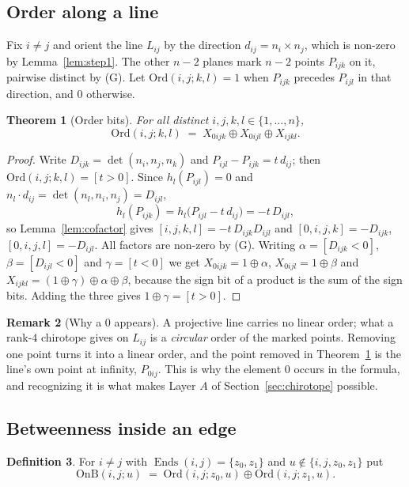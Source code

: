\documentclass[11pt,reqno]{amsart}
\theoremstyle{plain}
\newtheorem{theorem}{Theorem}[section]
\theoremstyle{definition}
\newtheorem{definition}[theorem]{Definition}
\newtheorem{remark}[theorem]{Remark}
\newcommand{\bra}[1]{[#1]}
\newcommand{\Ends}{\operatorname{Ends}}
\newcommand{\OnB}{\mathrm{OnB}}
\newcommand{\Ord}{\mathrm{Ord}}
\newcommand{\xor}{\oplus}
\DeclareMathOperator{\dett}{det}
\begin{document}
\subsection{Order along a line}
Fix $i\ne j$ and orient the line $L_{ij}$ by the direction $d_{ij}=n_i\times n_j$, which is non-zero by
Lemma~\ref{lem:step1}. The other $n-2$ planes mark $n-2$ points $P_{ijk}$ on it, pairwise distinct by
(G). Let $\Ord(i,j;k,l)=1$ when $P_{ijk}$ precedes $P_{ijl}$ in that direction, and $0$ otherwise.

\begin{theorem}[Order bits]\label{thm:order}
For all distinct $i,j,k,l\in\{1,\dots,n\}$,
\[
   \Ord(i,j;k,l)\;=\;X_{0ijk}\xor X_{0ijl}\xor X_{ijkl}.
\]
\end{theorem}

\begin{proof}
Write $D_{ijk}=\dett(n_i,n_j,n_k)$ and $P_{ijl}-P_{ijk}=t\,d_{ij}$; then $\Ord(i,j;k,l)=[t>0]$. Since
$h_l(P_{ijl})=0$ and $n_l\cdot d_{ij}=\dett(n_l,n_i,n_j)=D_{ijl}$,
\[
  h_l(P_{ijk})=h_l\big(P_{ijl}-t\,d_{ij}\big)=-t\,D_{ijl},
\]
so Lemma~\ref{lem:cofactor} gives $\bra{i,j,k,l}=-t\,D_{ijk}D_{ijl}$ and
$\bra{0,i,j,k}=-D_{ijk}$, $\bra{0,i,j,l}=-D_{ijl}$. All factors are non-zero by (G). Writing
$\alpha=[D_{ijk}<0]$, $\beta=[D_{ijl}<0]$ and $\gamma=[t<0]$ we get $X_{0ijk}=1\xor\alpha$,
$X_{0ijl}=1\xor\beta$ and $X_{ijkl}=(1\xor\gamma)\xor\alpha\xor\beta$, because the sign bit of a
product is the sum of the sign bits. Adding the three gives $1\xor\gamma=[t>0]$.
\end{proof}

\begin{remark}[Why a $0$ appears]\label{rem:cut}
A projective line carries no linear order; what a rank-$4$ chirotope gives on $L_{ij}$ is a
\emph{circular} order of the marked points. Removing one point turns it into a linear order, and the
point removed in Theorem~\ref{thm:order} is the line's own point at infinity, $P_{0ij}$. This is why
the element $0$ occurs in the formula, and recognizing it is what makes Layer $A$ of
Section~\ref{sec:chirotope} possible.
\end{remark}

\subsection{Betweenness inside an edge}

\begin{definition}\label{def:onb}
For $i\ne j$ with $\Ends(i,j)=\{z_0,z_1\}$ and $u\notin\{i,j,z_0,z_1\}$ put
\[
   \OnB(i,j;u)\;=\;\Ord(i,j;z_0,u)\xor\Ord(i,j;z_1,u).
\]
\end{definition}
\end{document}
